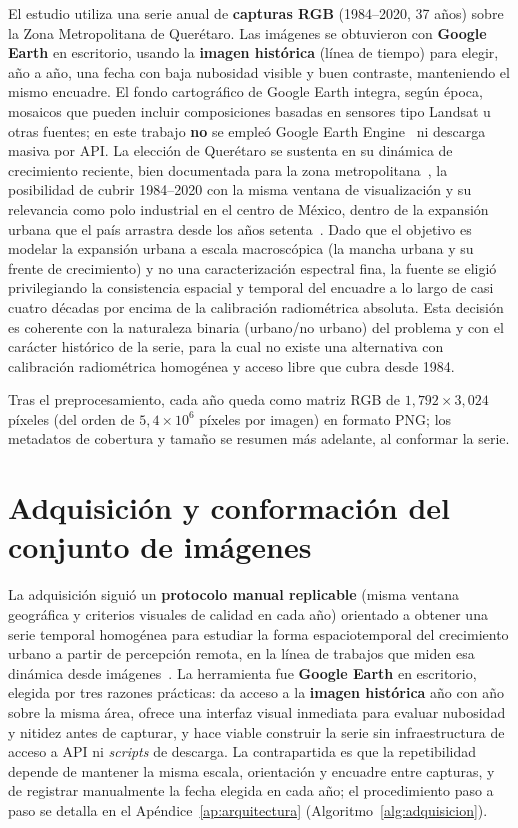 El estudio utiliza una serie anual de \textbf{capturas RGB} (1984--2020, 37 años) sobre la Zona Metropolitana de Querétaro. Las imágenes se obtuvieron con \textbf{Google Earth} en escritorio, usando la \textbf{imagen histórica} (línea de tiempo) para elegir, año a año, una fecha con baja nubosidad visible y buen contraste, manteniendo el mismo encuadre. El fondo cartográfico de Google Earth integra, según época, mosaicos que pueden incluir composiciones basadas en sensores tipo Landsat u otras fuentes; en este trabajo \textbf{no} se empleó Google Earth Engine~\parencite{Gorelick2017} ni descarga masiva por API. La elección de Querétaro se sustenta en su dinámica de crecimiento reciente, bien documentada para la zona metropolitana~\parencite{Huacuz2018Metropolizacion,DelgadoLopez2018}, la posibilidad de cubrir 1984--2020 con la misma ventana de visualización y su relevancia como polo industrial en el centro de México, dentro de la expansión urbana que el país arrastra desde los años setenta~\parencite{Montejano2023}. Dado que el objetivo es modelar la expansión urbana a escala macroscópica (la mancha urbana y su frente de crecimiento) y no una caracterización espectral fina, la fuente se eligió privilegiando la consistencia espacial y temporal del encuadre a lo largo de casi cuatro décadas por encima de la calibración radiométrica absoluta. Esta decisión es coherente con la naturaleza binaria (urbano/no urbano) del problema y con el carácter histórico de la serie, para la cual no existe una alternativa con calibración radiométrica homogénea y acceso libre que cubra desde 1984.

Tras el preprocesamiento, cada año queda como matriz RGB de \textbf{$1{,}792 \times 3{,}024$} píxeles (del orden de $5{,}4 \times 10^{6}$ píxeles por imagen) en formato PNG; los metadatos de cobertura y tamaño se resumen más adelante, al conformar la serie.

\section{Adquisición y conformación del conjunto de imágenes}

La adquisición siguió un \textbf{protocolo manual replicable} (misma ventana geográfica y criterios visuales de calidad en cada año) orientado a obtener una serie temporal homogénea para estudiar la forma espaciotemporal del crecimiento urbano a partir de percepción remota, en la línea de trabajos que miden esa dinámica desde imágenes~\parencite{Herold2003}. La herramienta fue \textbf{Google Earth} en escritorio, elegida por tres razones prácticas: da acceso a la \textbf{imagen histórica} año con año sobre la misma área, ofrece una interfaz visual inmediata para evaluar nubosidad y nitidez antes de capturar, y hace viable construir la serie sin infraestructura de acceso a API ni \textit{scripts} de descarga. La contrapartida es que la repetibilidad depende de mantener la misma escala, orientación y encuadre entre capturas, y de registrar manualmente la fecha elegida en cada año; el procedimiento paso a paso se detalla en el Apéndice~\ref{ap:arquitectura} (Algoritmo~\ref{alg:adquisicion}).

